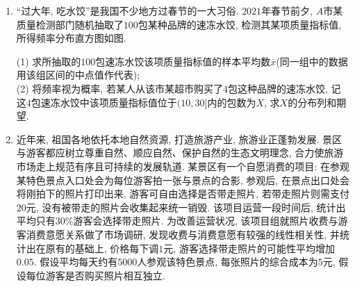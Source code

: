 \documentclass[10pt,a4paper]{article}
\newcommand{\blank}[1]{\underline{\hbox to #1pt{}}}
\begin{document}
\begin{enumerate}[1.]
\begin{center}
    \begin{tabular}{|c|c|c|c|}
        \hline
        $X$ & $-1$ & $0$ & $1$ \\ \hline
        $P$ & $\dfrac 12$ & $\dfrac 13$ & $\dfrac 16$ \\ \hline
    \end{tabular}
\end{center}
两个随机变量$X$, $Y$满足$X+2Y=4$, 则$E[X]=$\blank{50}, $E[Y]=$\blank{50}.
\item ``过大年, 吃水饺''是我国不少地方过春节的一大习俗. $2021$年春节前夕, $A$市某质量检测部门随机抽取了$100$包某种品牌的速冻水饺, 检测其某项质量指标值, 所得频率分布直方图如图.
\begin{center}
\end{center}
(1) 求所抽取的$100$包速冻水饺该项质量指标值的样本平均数$\overline x$(同一组中的数据用该组区间的中点值作代表);\\
(2) 将频率视为概率, 若某人从该市某超市购买了$4$包这种品牌的速冻水饺, 记这$4$包速冻水饺中该项质量指标值位于$(10,30]$内的包数为$X$, 求$X$的分布列和期望.
\item 近年来, 祖国各地依托本地自然资源, 打造旅游产业, 旅游业正蓬勃发展. 景区与游客都应树立尊重自然、顺应自然、保护自然的生态文明理念, 合力使旅游市场走上规范有序且可持续的发展轨道. 某景区有一个自愿消费的项目: 在参观某特色景点入口处会为每位游客拍一张与景点的合影, 参观后, 在景点出口处会将刚拍下的照片打印出来, 游客可自由选择是否带走照片, 若带走照片则需支付$20$元, 没有被带走的照片会收集起来统一销毁. 该项目运营一段时间后, 统计出平均只有$30\%$游客会选择带走照片. 为改善运营状况, 该项目组就照片收费与游客消费意愿关系做了市场调研, 发现收费与消费意愿有较强的线性相关性, 并统计出在原有的基础上, 价格每下调$1$元, 游客选择带走照片的可能性平均增加$0.05$. 假设平均每天约有$5000$人参观该特色景点, 每张照片的综合成本为$5$元, 假设每位游客是否购买照片相互独立.\\

\end{enumerate}
\end{document}
